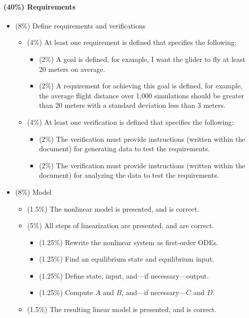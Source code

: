 \documentclass[12pt]{article}
\begin{document}
\paragraph{(40\%) Requirements}
\begin{itemize}

\item (8\%) Define requirements and verifications
\begin{itemize}
\item (4\%) At least one requirement is defined that specifies the following:
\begin{itemize}
\item (2\%) A goal is defined, for example, I want the glider to fly at least 20 meters on average.
\item (2\%) A requirement for achieving this goal is defined, for example, the average flight distance over 1,000 simulations should be greater than 20 meters with a standard deviation less than 3 meters.
\end{itemize}
\item (4\%) At least one verification is defined that specifies the following:
\begin{itemize}
\item (2\%) The verification must provide instructions (written within the document) for generating data to test the requirements.
\item (2\%) The verification must provide instructions (written within the document) for analyzing the data to test the requirements.
\end{itemize}
\end{itemize}

\item (8\%) Model
\begin{itemize}
\item (1.5\%) The nonlinear model is presented, and is correct.
\item (5\%) All steps of linearization are presented, and are correct.
\begin{itemize}
\item (1.25\%) Rewrite the nonlinear system as first-order ODEs.
\item (1.25\%) Find an equilibrium state and equilibrium input.
\item (1.25\%) Define state, input, and---if necessary---output.
\item (1.25\%) Compute $A$ and $B$, and---if necessary---$C$ and $D$.
\end{itemize}
\item (1.5\%) The resulting linear model is presented, and is correct.
\end{itemize}


\end{itemize}
\end{document}
